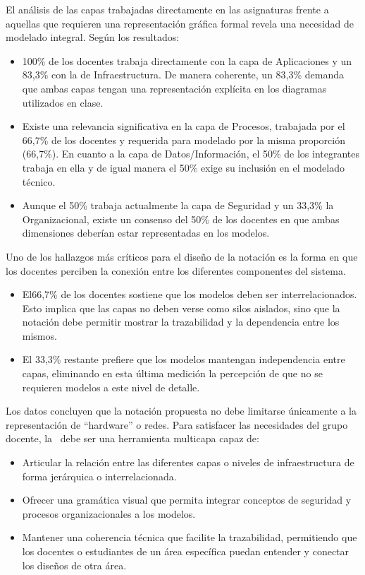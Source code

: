 El análisis de las capas trabajadas directamente en las asignaturas frente a aquellas que requieren una representación gráfica formal revela una necesidad de modelado integral. Según los resultados:



\begin{itemize}
	\item 100\% de los docentes trabaja directamente con la capa de Aplicaciones y un 83,3\% con la de Infraestructura. De manera coherente, un 83,3\% demanda que ambas capas tengan una representación explícita en los diagramas utilizados en clase.
	\item Existe una relevancia significativa en la capa de Procesos, trabajada por el 66,7\% de los docentes y requerida para modelado por la misma proporción (66,7\%). En cuanto a la capa de Datos/Información, el 50\% de los integrantes trabaja en ella y de igual manera el 50\% exige su inclusión en el modelado técnico.
	\item Aunque el 50\% trabaja actualmente la capa de Seguridad y un 33,3\% la Organizacional, existe un consenso del 50\% de los docentes en que ambas dimensiones deberían estar representadas en los modelos.
\end{itemize}

Uno de los hallazgos más críticos para el diseño de la notación \NDITI es la forma en que los docentes perciben la conexión entre los diferentes componentes del sistema.


\begin{itemize}
	\item El66,7\% de los docentes sostiene que los modelos deben ser interrelacionados. Esto implica que las capas no deben verse como silos aislados, sino que la notación debe permitir mostrar la trazabilidad y la dependencia entre los mismos.
	\item El 33,3\% restante prefiere que los modelos mantengan independencia entre capas, eliminando en esta última medición la percepción de que no se requieren modelos a este nivel de detalle.
\end{itemize}

Los datos concluyen que la notación propuesta no debe limitarse únicamente a la representación de ``hardware'' o redes. Para satisfacer las necesidades del grupo docente, la \NDITI~debe ser una herramienta multicapa capaz de:

\begin{itemize}
	\item Articular la relación entre las diferentes capas o niveles de infraestructura de forma jerárquica o interrelacionada.
	\item Ofrecer una gramática visual que permita integrar conceptos de seguridad y procesos organizacionales a los modelos.
	\item Mantener una coherencia técnica que facilite la trazabilidad, permitiendo que los docentes o estudiantes de un área específica puedan entender y conectar los diseños de otra área.
\end{itemize}

